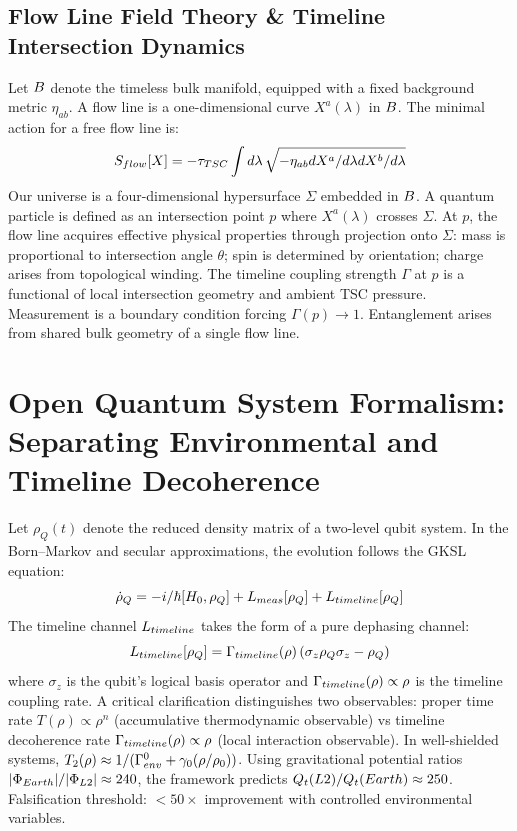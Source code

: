 \documentclass[11pt,a4paper]{article}
\def\frac#1#2{#1/#2} \def\phantom#1{} \def\ensuremath#1{#1}
\let\text\relax \let\mathrm\relax \let\mathbf\relax \let\mathcal\relax
\begin{document}
\subsection{Flow Line Field Theory \& Timeline Intersection Dynamics}
Let $\mathcal{B}$ denote the timeless bulk manifold, equipped with a fixed background metric $\eta_{ab}$. A flow line is a one-dimensional curve $X^a(\lambda)$ in $\mathcal{B}$. The minimal action for a free flow line is:
\begin{equation}
S_{\text{flow}}[X] = -\tau_{\text{TSC}} \int d\lambda \, \sqrt{-\eta_{ab} \frac{dX^a}{d\lambda} \frac{dX^b}{d\lambda}}
\end{equation}
Our universe is a four-dimensional hypersurface $\Sigma$ embedded in $\mathcal{B}$. A quantum particle is defined as an intersection point $p$ where $X^a(\lambda)$ crosses $\Sigma$. At $p$, the flow line acquires effective physical properties through projection onto $\Sigma$: mass is proportional to intersection angle $\theta$; spin is determined by orientation; charge arises from topological winding. The timeline coupling strength $\Gamma$ at $p$ is a functional of local intersection geometry and ambient TSC pressure. Measurement is a boundary condition forcing $\Gamma(p) \to 1$. Entanglement arises from shared bulk geometry of a single flow line.

\section{Open Quantum System Formalism: Separating Environmental and Timeline Decoherence}
Let $\rho_Q(t)$ denote the reduced density matrix of a two-level qubit system. In the Born--Markov and secular approximations, the evolution follows the GKSL equation:
\begin{equation}
\dot{\rho}_Q = -\frac{i}{\hbar}[H_0, \rho_Q] + \mathcal{L}_{\text{meas}}[\rho_Q] + \mathcal{L}_{\text{timeline}}[\rho_Q]
\end{equation}
The timeline channel $\mathcal{L}_{\text{timeline}}$ takes the form of a pure dephasing channel:
\begin{equation}
\mathcal{L}_{\text{timeline}}[\rho_Q] = \Gamma_{\text{timeline}}(\rho) \left( \sigma_z \rho_Q \sigma_z - \rho_Q \right)
\end{equation}
where $\sigma_z$ is the qubit's logical basis operator and $\Gamma_{\text{timeline}}(\rho) \propto \rho$ is the timeline coupling rate. A critical clarification distinguishes two observables: proper time rate $T(\rho) \propto \rho^n$ (accumulative thermodynamic observable) vs timeline decoherence rate $\Gamma_{\text{timeline}}(\rho) \propto \rho$ (local interaction observable). In well-shielded systems, $T_2(\rho) \approx 1/(\Gamma_{\text{env}}^0 + \gamma_0 (\rho/\rho_0))$. Using gravitational potential ratios $|\Phi_{\text{Earth}}|/|\Phi_{\text{L2}}| \approx 240$, the framework predicts $Q_t(\text{L2})/Q_t(\text{Earth}) \approx 250$. Falsification threshold: $<50\times$ improvement with controlled environmental variables.
\end{document}
